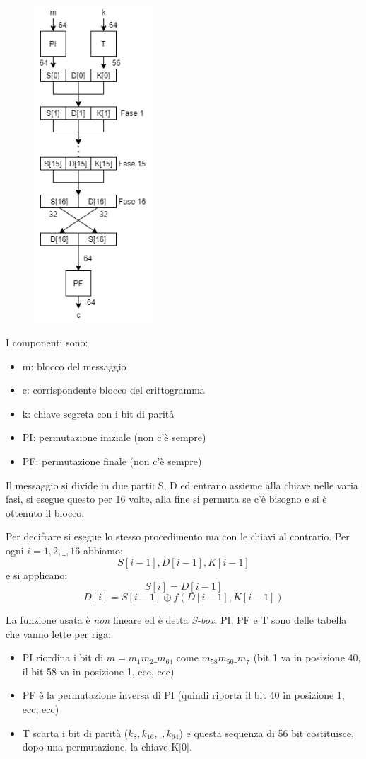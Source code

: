 \begin{figure}
    \includegraphics[width = 125pt]{DES_1.png}
\end{figure} 
I componenti sono:
\begin{itemize}
    \item m: blocco del messaggio
    \item c: corrispondente blocco del crittogramma
    \item k: chiave segreta con i bit di parità
    \item PI: permutazione iniziale (non c'è sempre)
    \item PF: permutazione finale (non c'è sempre)
\end{itemize}
Il messaggio si divide in due parti: S, D ed entrano assieme alla chiave nelle varia fasi, si esegue questo per 16 volte, alla fine si permuta se c'è bisogno e si è ottenuto il blocco.

Per decifrare si esegue lo stesso procedimento ma con le chiavi al contrario. Per ogni $i=1, 2, \_, 16$ abbiamo:
$$ S[i-1], D[i-1], K[i-1] $$
e si applicano:
$$ S[i] = D[i-1] $$
$$ D[i] = S[i-1] \oplus f(D[i-1],K[i-1]) $$

La funzione usata è \emph{non} lineare ed è detta \emph{S-box}. PI, PF e T sono delle tabella che vanno lette per riga:
\begin{itemize}
    \item PI riordina i bit di $m=m_1m_2\_m_64$ come $m_{58}m_{50}\_m_{7}$ (bit 1 va in posizione 40, il bit 58 va in posizione 1, ecc, ecc)
    \item PF è la permutazione inversa di PI (quindi riporta il bit 40 in posizione 1, ecc, ecc)
    \item T scarta i bit di parità ($k_8, k_{16}, \_, k_{64}$) e questa sequenza di 56 bit costituisce, dopo una permutazione, la chiave K[0].
\end{itemize}

